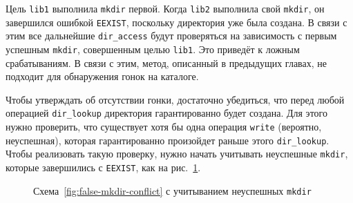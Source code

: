 Цель \texttt{lib1} выполнила \texttt{mkdir} первой. Когда \texttt{lib2} выполнила свой \texttt{mkdir}, он завершился ошибкой \texttt{EEXIST}, поскольку директория уже была создана. В связи с этим все дальнейшие \texttt{dir\_access} будут проверяться на зависимость с первым успешным \texttt{mkdir}, совершенным целью \texttt{lib1}. Это приведёт к ложным срабатываниям. В связи с этим, метод, описанный в предыдущих главах, не подходит для обнаружения гонок на каталоге.

Чтобы утверждать об отсутствии гонки, достаточно убедиться, что перед любой операцией \texttt{dir\_lookup} директория гарантированно будет создана. Для этого нужно проверить, что существует хотя бы одна операция \texttt{write} (вероятно, неуспешная), которая гарантированно произойдет раньше этого \texttt{dir\_lookup}. Чтобы реализовать такую проверку, нужно начать учитывать неуспешные \texttt{mkdir}, которые завершились с \texttt{EEXIST}, как на рис.~\ref{fig:false-mkdir-conflict-fixed}.

\begin{figure}[H]
    \centering
    \caption{Схема~\ref{fig:false-mkdir-conflict} с учитыванием неуспешных \texttt{mkdir}}
    \label{fig:false-mkdir-conflict-fixed}
\end{figure}

